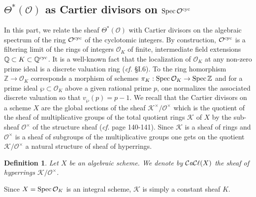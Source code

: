 \documentclass[noams,lp]{compositio}
\newtheorem{defn}[thm]{Definition} %
\def\Spec{{\rm Spec\,}}
\def\Q{{\mathbb Q}}
\def\Z{{\mathbb Z}}
\def\cK{{\mathcal K}}
\def\cO{{\mathcal O}}
\def\qcy{{\Q^{\rm cyc}}}
\def\ocy{{\cO^{\rm cyc}}}
\def\card{{\mathcal{C}\it{a}\mathcal{C}\ell}}
\newcommand{\cf}{{\it cf.}}
\begin{document}
\subsection{$\Theta^*(\cO)$ as Cartier divisors on $\Spec\ocy$}
In this part, we relate the sheaf $\Theta^*(\cO)$ with Cartier divisors on the algebraic spectrum  of the ring $\ocy$ of the cyclotomic integers. By construction, $\ocy$ is a filtering limit of the rings of integers $\cO_K$ of finite, intermediate field extensions $\Q\subset K\subset \qcy$. It is a well-known fact that the localization of $\cO_K$ at any non-zero prime ideal is a discrete valuation ring (\cf \cite{Hart} \S I.6). 
To the ring homorphism  $\Z\to  \cO_K$ corresponds a morphism of schemes $\pi_K:\Spec\cO_K\to \Spec\Z$ and for a prime ideal $\wp\subset \cO_K$ above a given rational prime $p$, one  normalizes the associated discrete valuation  so that $v_\wp(p)=p-1$.\newline
We recall that the Cartier divisors on a scheme $X$ are the global sections of the sheaf $\cK^\times/\cO^\times$ which is the quotient of the sheaf of multiplicative groups of the total quotient rings $\cK$ of $X$ by the sub-sheaf $\cO^\times$ of the structure sheaf (\cf \cite{Hart} page 140-141). Since $\cK$  is a sheaf of rings and $\cO^\times$ is a sheaf of subgroups of the multiplicative groups one gets on the quotient $\cK/\cO^\times$ a natural structure of sheaf of hyperrings.

\begin{defn}\label{cartierdiv} Let $X$ be an algebraic scheme. We denote by $\card(X)$ the sheaf of hyperrings $\cK/\cO^\times$.
\end{defn}

Since $X=\Spec\cO_K$ is an integral scheme, $\cK$ is simply a constant sheaf $K$. 
\end{document}
